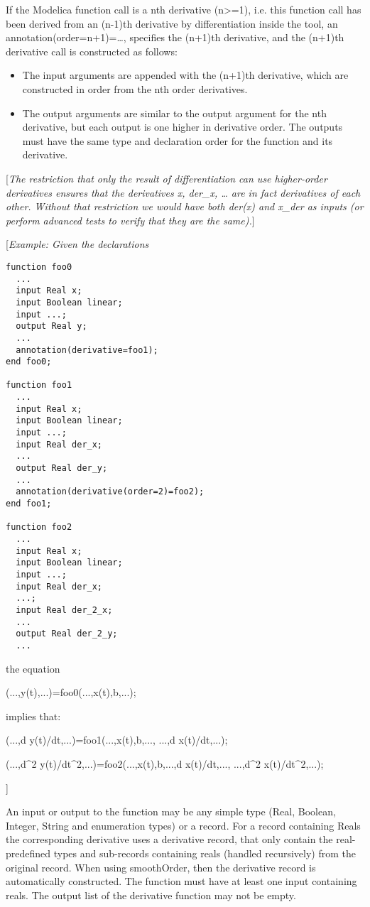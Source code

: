 If the Modelica function call is a nth derivative (n\textgreater{}=1),
i.e. this function call has been derived from an (n-1)th derivative by
differentiation inside the tool, an annotation(order=n+1)=\ldots{},
specifies the (n+1)th derivative, and the (n+1)th derivative call is
constructed as follows:

\begin{itemize}
\item
  The input arguments are appended with the (n+1)th derivative, which
  are constructed in order from the nth order derivatives.
\item
  The output arguments are similar to the output argument for the nth
  derivative, but each output is one higher in derivative order. The
  outputs must have the same type and declaration order for the function
  and its derivative.
\end{itemize}

{[}\emph{The restriction that only the result of differentiation can use
higher-order derivatives ensures that the derivatives x, der\_x,
\ldots{} are in fact derivatives of each other. Without that restriction
we would have both der(x) and x\_der as inputs (or perform advanced
tests to verify that they are the same).}{]}

{[}\emph{Example: Given the declarations}

\begin{lstlisting}[language=modelica]
function foo0
  ...
  input Real x;
  input Boolean linear;
  input ...;
  output Real y;
  ...
  annotation(derivative=foo1);
end foo0;

function foo1
  ...
  input Real x;
  input Boolean linear;
  input ...;
  input Real der_x;
  ...
  output Real der_y;
  ...
  annotation(derivative(order=2)=foo2);
end foo1;

function foo2
  ...
  input Real x;
  input Boolean linear;
  input ...;
  input Real der_x;
  ...;
  input Real der_2_x;
  ...
  output Real der_2_y;
  ...
\end{lstlisting}
the equation

(...,y(t),...)=foo0(...,x(t),b,...);

implies that:

(...,d y(t)/dt,...)=foo1(...,x(t),b,..., ...,d x(t)/dt,...);

(...,d\^{}2 y(t)/dt\^{}2,...)=foo2(...,x(t),b,...,d x(t)/dt,...,
...,d\^{}2 x(t)/dt\^{}2,...);

{]}

An input or output to the function may be any simple type (Real,
Boolean, Integer, String and enumeration types) or a record. For a
record containing Reals the corresponding derivative uses a derivative
record, that only contain the real-predefined types and sub-records
containing reals (handled recursively) from the original record. When
using smoothOrder, then the derivative record is automatically
constructed. The function must have at least one input containing reals.
The output list of the derivative function may not be empty.

